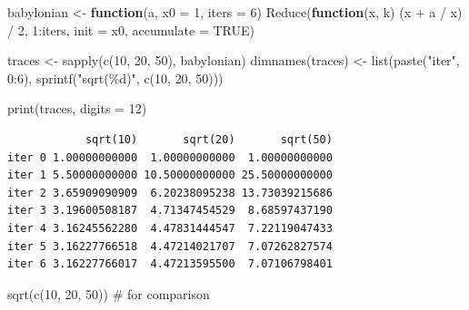 \documentclass[
  letterpaper,
  DIV=11,
  numbers=noendperiod]{scrreprt}
\newenvironment{Shaded}{\begin{snugshade}}{\end{snugshade}}
\newcommand{\AttributeTok}[1]{\textcolor[rgb]{0.40,0.45,0.13}{#1}}
\newcommand{\CommentTok}[1]{\textcolor[rgb]{0.37,0.37,0.37}{#1}}
\newcommand{\ConstantTok}[1]{\textcolor[rgb]{0.56,0.35,0.01}{#1}}
\newcommand{\ControlFlowTok}[1]{\textcolor[rgb]{0.00,0.23,0.31}{\textbf{#1}}}
\newcommand{\DecValTok}[1]{\textcolor[rgb]{0.68,0.00,0.00}{#1}}
\newcommand{\FunctionTok}[1]{\textcolor[rgb]{0.28,0.35,0.67}{#1}}
\newcommand{\NormalTok}[1]{\textcolor[rgb]{0.00,0.23,0.31}{#1}}
\newcommand{\OtherTok}[1]{\textcolor[rgb]{0.00,0.23,0.31}{#1}}
\newcommand{\SpecialCharTok}[1]{\textcolor[rgb]{0.37,0.37,0.37}{#1}}
\newcommand{\StringTok}[1]{\textcolor[rgb]{0.13,0.47,0.30}{#1}}
\begin{document}
\begin{Shaded}
\begin{Highlighting}[]
\NormalTok{babylonian }\OtherTok{\textless{}{-}} \ControlFlowTok{function}\NormalTok{(a, }\AttributeTok{x0 =} \DecValTok{1}\NormalTok{, }\AttributeTok{iters =} \DecValTok{6}\NormalTok{)}
  \FunctionTok{Reduce}\NormalTok{(}\ControlFlowTok{function}\NormalTok{(x, k) (x }\SpecialCharTok{+}\NormalTok{ a }\SpecialCharTok{/}\NormalTok{ x) }\SpecialCharTok{/} \DecValTok{2}\NormalTok{, }\DecValTok{1}\SpecialCharTok{:}\NormalTok{iters, }\AttributeTok{init =}\NormalTok{ x0, }\AttributeTok{accumulate =} \ConstantTok{TRUE}\NormalTok{)}

\NormalTok{traces }\OtherTok{\textless{}{-}} \FunctionTok{sapply}\NormalTok{(}\FunctionTok{c}\NormalTok{(}\DecValTok{10}\NormalTok{, }\DecValTok{20}\NormalTok{, }\DecValTok{50}\NormalTok{), babylonian)}
\FunctionTok{dimnames}\NormalTok{(traces) }\OtherTok{\textless{}{-}} \FunctionTok{list}\NormalTok{(}\FunctionTok{paste}\NormalTok{(}\StringTok{"iter"}\NormalTok{, }\DecValTok{0}\SpecialCharTok{:}\DecValTok{6}\NormalTok{), }\FunctionTok{sprintf}\NormalTok{(}\StringTok{"sqrt(\%d)"}\NormalTok{, }\FunctionTok{c}\NormalTok{(}\DecValTok{10}\NormalTok{, }\DecValTok{20}\NormalTok{, }\DecValTok{50}\NormalTok{)))}

\FunctionTok{print}\NormalTok{(traces, }\AttributeTok{digits =} \DecValTok{12}\NormalTok{)}
\end{Highlighting}
\end{Shaded}

\begin{verbatim}
            sqrt(10)       sqrt(20)       sqrt(50)
iter 0 1.00000000000  1.00000000000  1.00000000000
iter 1 5.50000000000 10.50000000000 25.50000000000
iter 2 3.65909090909  6.20238095238 13.73039215686
iter 3 3.19600508187  4.71347454529  8.68597437190
iter 4 3.16245562280  4.47831444547  7.22119047433
iter 5 3.16227766518  4.47214021707  7.07262827574
iter 6 3.16227766017  4.47213595500  7.07106798401
\end{verbatim}

\begin{Shaded}
\begin{Highlighting}[]
\FunctionTok{sqrt}\NormalTok{(}\FunctionTok{c}\NormalTok{(}\DecValTok{10}\NormalTok{, }\DecValTok{20}\NormalTok{, }\DecValTok{50}\NormalTok{))                       }\CommentTok{\# for comparison}
\end{Highlighting}
\end{Shaded}
\end{document}
